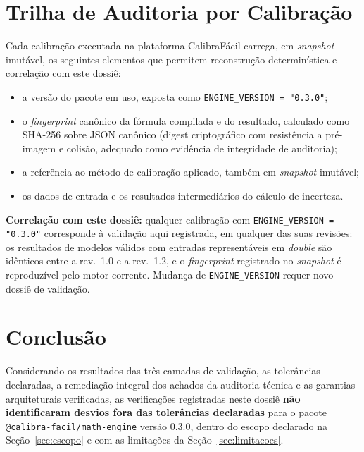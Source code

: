 \documentclass[11pt,a4paper]{article}
\newcommand{\docVersion}{0.3.0}
\newcommand{\docRevision}{1.2}
\begin{document}
\section{Trilha de Auditoria por Calibração}

Cada calibração executada na plataforma CalibraFácil carrega, em \emph{snapshot} imutável, os seguintes elementos que permitem reconstrução determinística e correlação com este dossiê:

\begin{itemize}
  \item a versão do pacote em uso, exposta como \texttt{ENGINE\_VERSION = "\docVersion"};
  \item o \emph{fingerprint} canônico da fórmula compilada e do resultado, calculado como SHA-256 sobre JSON canônico (digest criptográfico com resistência a pré-imagem e colisão, adequado como evidência de integridade de auditoria);
  \item a referência ao método de calibração aplicado, também em \emph{snapshot} imutável;
  \item os dados de entrada e os resultados intermediários do cálculo de incerteza.
\end{itemize}

\textbf{Correlação com este dossiê:} qualquer calibração com \texttt{ENGINE\_VERSION = "\docVersion"} corresponde à validação aqui registrada, em qualquer das suas revisões: os resultados de modelos válidos com entradas representáveis em \emph{double} são idênticos entre a rev.\ 1.0 e a rev.\ \docRevision{}, e o \emph{fingerprint} registrado no \emph{snapshot} é reproduzível pelo motor corrente. Mudança de \texttt{ENGINE\_VERSION} requer novo dossiê de validação.

\section{Conclusão}

Considerando os resultados das três camadas de validação, as tolerâncias declaradas, a remediação integral dos achados da auditoria técnica e as garantias arquiteturais verificadas, as verificações registradas neste dossiê \textbf{não identificaram desvios fora das tolerâncias declaradas} para o pacote \texttt{@calibra-facil/math-engine} versão \docVersion{}, dentro do escopo declarado na Seção~\ref{sec:escopo} e com as limitações da Seção~\ref{sec:limitacoes}.
\end{document}
